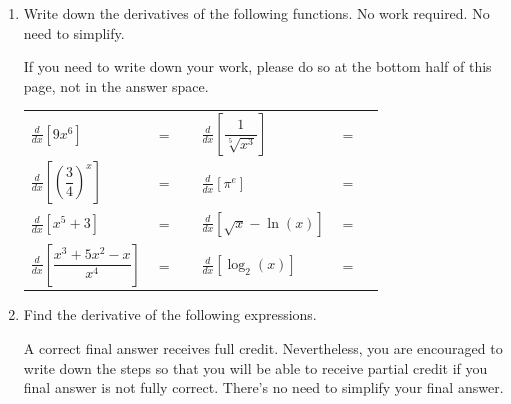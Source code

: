 \documentclass[11pt]{article}
\begin{document}
\begin{enumerate}
\item Write down the derivatives of the following functions. No work required. No need to simplify.

If you need to write down your work, please do so at the bottom half of this page, not in the answer space.

\begin{center}
        \begin{tabular}{l c r l c r}
            $\displaystyle\frac{d}{dx}\left[ 9x^{6} \right]$ & $=$ & \rule[-8pt]{1.5in}{0.4pt} &
            $\displaystyle\frac{d}{dx}\left[ \dfrac{1}{\sqrt[5]{x^3}} \right]$ & $=$ & \rule[-8pt]{1.5in}{0.4pt}\\[0.3in]
            $\displaystyle\frac{d}{dx}\left[ \left(\dfrac{3}{4}\right)^x \right]$ & $=$ & \rule[-8pt]{1.5in}{0.4pt} & 
            $\displaystyle\frac{d}{dx}\left[ \pi^{e} \right]$ & $=$ & \rule[-8pt]{1.5in}{0.4pt}\\[0.3in]
            $\displaystyle\frac{d}{dx}\left[ x^5+3 \right]$ & $=$ & \rule[-8pt]{1.5in}{0.4pt}&
            $\displaystyle\frac{d}{dx}\left[ \sqrt{x}-\ln(x) \right]$ & $=$ & \rule[-8pt]{1.5in}{0.4pt}\\[0.3in]
            $\displaystyle\frac{d}{dx}\left[ \dfrac{x^3+5x^2-x}{x^4} \right]$ & $=$ & \rule[-8pt]{1.5in}{0.4pt} & 
            $\displaystyle\frac{d}{dx}\left[ \log_{2}(x) \right]$ & $=$ & \rule[-8pt]{1.5in}{0.4pt}\\[0.3in]
        \end{tabular}
        
\end{center}



\newpage


\item Find the derivative of the following expressions. 

A correct final answer receives full credit. Nevertheless, you are encouraged to write down the steps so that you will be able to receive partial credit if you final answer is not fully correct. There's no need to simplify your final answer.


\end{enumerate}
\end{document}
